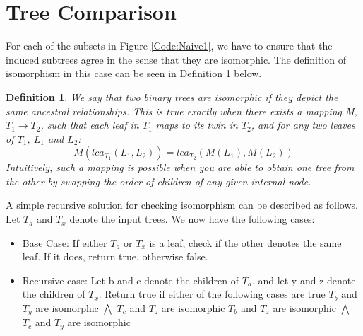 \section{Tree Comparison}
For each of the subsets in Figure \ref{Code:Naive1}, we have to ensure that the induced subtrees agree in the sense that they are isomorphic. The definition of isomorphism in this case can be seen in Definition 1 below.

\newtheorem{definition}{Definition}
\begin{definition}
	We say that two binary trees are isomorphic if they depict the same ancestral relationships. This is true exactly when there exists a mapping M, $T_1 \rightarrow T_2$, such that each leaf in $T_1$ maps to its twin in $T_2$, and for any two leaves of $T_1$, $L_1$ and $L_2$:  
	\begin{equation*}
		M(lca_{T_1}(L_{1}, L_{2})) = lca_{T_2}(M(L_{1}), M(L_{2}))
	\end{equation*} 
	Intuitively, such a mapping is possible when you are able to obtain one tree from the other by swapping the order of children of any given internal node. \\
\end{definition}

A simple recursive solution for checking isomorphism can be described as follows. Let $T_a$ and $T_x$ denote the input trees. We now have the following cases:
\begin{itemize}
	\item Base Case: If either $T_a$ or $T_x$ is a leaf, check if the other denotes the same leaf. If it does, return true, otherwise false.
	\item Recursive case: Let b and c denote the children of $T_a$, and let y and z denote the children of $T_x$. Return true if either of the following cases are true
	\subitem $T_b$ and $T_y$ are isomorphic $\bigwedge$ $T_c$ and $T_z$ are isomorphic
	\subitem $T_b$ and $T_z$ are isomorphic $\bigwedge$ $T_c$ and $T_y$ are isomorphic
\end{itemize}






